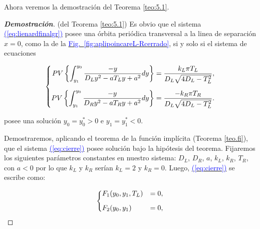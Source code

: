 \documentclass[12pt,a4paper]{report} %
\newcommand{\fref}[1]{\hyperref[#1]{\textcolor{blue}{Fig.~\ref*{#1}}}}
\newcommand{\eref}[1]{\hyperref[#1]{\textcolor{blue}{(\ref*{#1})}}}
\newcommand{\fref}[1]{\hyperref[#1]{\textcolor{blue}{\textit{Fig.~\ref*{#1}}}}}
\newcommand{\eref}[1]{\hyperref[#1]{\textcolor{blue}{\textit{(\ref*{#1})}}}}
\begin{document}
	\vspace{0.5cm}\noindent Ahora veremos la demostración del Teorema \ref{teo:5.1}.
	\begin{proof}[\textbf{Demostración}](del Teorema \ref{teo:5.1})
		\label{dem5.1}
	Es obvio que el sistema \eref{eq:lienardfinalgr} posee una órbita periódica transversal a la linea de separación $x=0$, como la de la \fref{fig:aplipoincareL-Rcerrado}, si y solo si el sistema de ecuaciones
	
	\begin{equation}
		\label{eq:cierre}
		\scalebox{1}{$\displaystyle
			\left\{
			\begin{aligned}
				PV\left\{\int_{y_1}^{y_0}\frac{-y}{D_Ly^2-aT_Ly+a^2}dy\right\}&=\frac{k_L\pi T_L}{D_L\sqrt{4D_L-T_L^2}},
				\\[2mm]
				PV\left\{\int_{y_1}^{y_0}\frac{-y}{D_Ry^2-aT_Ry+a^2}dy\right\}&=\frac{-k_R\pi T_R}{D_L\sqrt{4D_L-T_L^2}}.
			\end{aligned}
			\right. 
			$}
	\end{equation}\smallskip
	
	\vspace{0.5cm}\noindent posee una solución $y_0=y_0^*>0$ e $y_1=y_1^*<0$.
	
	\vspace{0.5cm}\noindent Demostraremos, aplicando el teorema de la función implícita (Teorema \ref{teo.fi}), que el sistema \eref{eq:cierre} posee solución bajo la hipótesis del teorema. Fijaremos los siguientes parámetros constantes en nuestro sistema: $D_L$, $D_R$, $a$, $k_L$, $k_R$, $T_R$, con $a<0$ por lo que $k_L$ y $k_R$ serían $k_L=2$ y $k_R=0$. Luego, \eref{eq:cierre} se escribe como:
	

	
	\begin{equation}
		\label{eq:cierre3}
		\scalebox{1}{$\displaystyle
			\left\{
			\begin{aligned}
				&F_1(y_0,y_1,T_L)&=0,
				\\[2mm]
				&F_2(y_0,y_1)&=0,
			\end{aligned}
			\right. 
			$}
	\end{equation}\smallskip
	

\end{proof}
\end{document}
